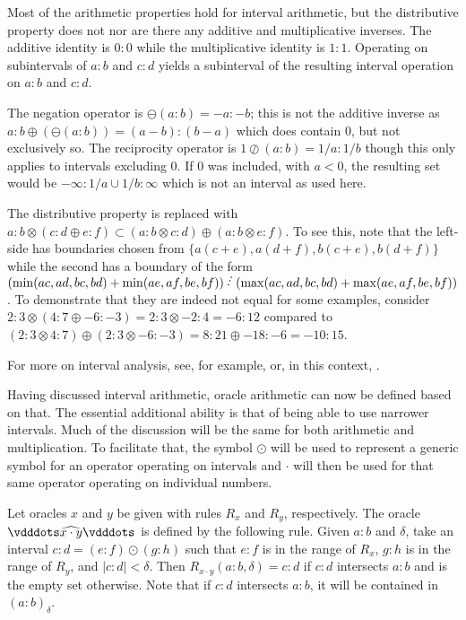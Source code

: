 \documentclass[12pt]{article}
\begin{document}
Most of the arithmetic properties hold for interval arithmetic, but the distributive property does not nor are there any additive and multiplicative inverses. The additive identity is $0:0$ while the multiplicative identity is $1:1$. Operating on subintervals of $a:b$ and $c:d$ yields a subinterval of the resulting interval operation on $a:b$ and $c:d$. 

The negation operator is $\ominus(a:b) = -a:-b$; this is not the additive inverse as $a:b \oplus (\ominus(a :b )) = (a-b):(b-a)$ which does contain 0, but not exclusively so. The reciprocity operator is $1 \oslash (a:b) = 1/a : 1/b$ though this only applies to intervals excluding 0. If 0 was included, with $a < 0$, the resulting set would be $-\infty:1/a \cup 1/b : \infty $ which is not an interval as used here.

The distributive property is replaced with $ a:b \otimes ( c:d \oplus e:f) \subset (a:b \otimes c:d) \oplus (a:b \otimes e:f)$. To see this, note that the left-side has boundaries chosen from $\{a(c+e), a(d+f), b(c+e), b(d+f)\}$ while the second has a boundary of the form $(\min(ac, ad, bc, bd) + \min(ae, af, be, bf) ) \lte (\max(ac, ad, bc, bd) + \max(ae, af, be, bf) )$. To demonstrate that they are indeed not equal for some examples, consider $2:3 \otimes ( 4:7 \oplus -6:-3) = 2:3 \otimes -2:4 = -6:12$ compared to $(2:3 \otimes 4:7) \oplus (2:3 \otimes -6:-3) = 8:21 \oplus -18:-6 = -10:15$. 

For more on interval analysis, see, for example, \cite{moore} or, in this context, \cite{taylor23main}.

Having discussed interval arithmetic, oracle arithmetic can now be defined based on that. The essential additional ability is that of being able to use narrower intervals. Much of the discussion will be the same for both arithmetic and multiplication. To facilitate that, the symbol $\odot$ will be used to represent a generic symbol for an operator operating on intervals and $\cdot$ will then be used for that same operator operating on individual numbers.

Let oracles $x$ and $y$ be given with rules $R_x$ and $R_y$, respectively. The oracle $\xora[x \cdot y]$ is defined by the following rule. Given $a:b$ and $\delta$, take an interval $c:d = (e:f) \odot (g:h)$ such that $e:f$ is in the range of $R_x$, $g:h$ is in the range of $R_y$, and $|c:d| < \delta$. Then $R_{x \cdot y}(a:b, \delta) = c:d$ if $c:d$ intersects $a:b$ and is the empty set otherwise. Note that if $c:d$ intersects $a:b$, it will be contained in $(a:b)_\delta$. 
\end{document}
